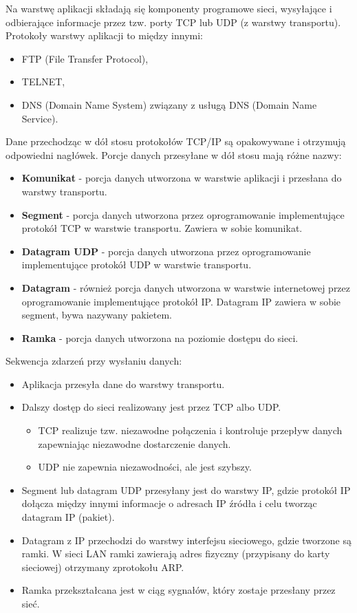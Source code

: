 \documentclass[a4paper]{article}
\begin{document}
Na warstwę aplikacji składają się komponenty programowe sieci, wysyłające i odbierające
informacje przez tzw. porty TCP lub UDP (z warstwy transportu).
Protokoły warstwy aplikacji to między innymi:
\begin{itemize}
    \item FTP (File Transfer Protocol),
    \item TELNET,
    \item DNS (Domain Name System) związany z usługą DNS (Domain Name Service).
\end{itemize}


Dane przechodząc w dół stosu protokołów TCP/IP są opakowywane i otrzymują
odpowiedni nagłówek. Porcje danych przesyłane w dół stosu mają różne
nazwy:
\begin{itemize}
    \item \textbf{Komunikat} - porcja danych utworzona w warstwie aplikacji i przesłana do warstwy transportu.
    \item \textbf{Segment} - porcja danych utworzona przez oprogramowanie implementujące protokół TCP w warstwie transportu. Zawiera w sobie komunikat.
    \item \textbf{Datagram UDP} - porcja danych utworzona przez oprogramowanie implementujące protokół UDP w warstwie transportu.
    \item \textbf{Datagram} - również porcja danych utworzona w warstwie internetowej przez oprogramowanie implementujące protokół IP. Datagram IP zawiera w sobie segment, bywa nazywany pakietem.
    \item \textbf{Ramka} - porcja danych utworzona na poziomie dostępu do sieci.
\end{itemize}

Sekwencja zdarzeń przy wysłaniu danych:
\begin{itemize}
    \item Aplikacja przesyła dane do warstwy transportu.
    \item Dalszy dostęp do sieci realizowany jest przez TCP albo UDP.
    \begin{itemize}
        \item TCP realizuje tzw. niezawodne połączenia i kontroluje przepływ danych zapewniając niezawodne dostarczenie danych.
        \item UDP nie zapewnia niezawodności, ale jest szybszy.
    \end{itemize}
    \item Segment lub datagram UDP przesyłany jest do warstwy IP, gdzie protokół IP dołącza między innymi informacje o adresach IP źródła i celu tworząc datagram IP (pakiet).
    \item Datagram z IP przechodzi do warstwy interfejsu sieciowego, gdzie tworzone są ramki. W sieci LAN ramki zawierają adres fizyczny (przypisany do karty sieciowej) otrzymany zprotokołu ARP.
    \item Ramka przekształcana jest w ciąg sygnałów, który zostaje przesłany przez sieć.
\end{itemize}
\end{document}
